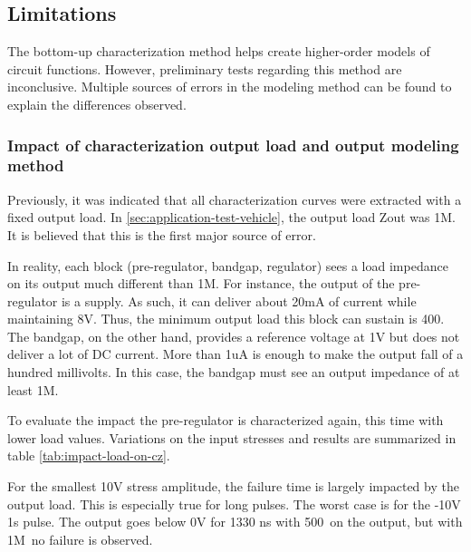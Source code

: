 \subsection{Limitations}
\label{sec:current-limitations}
The bottom-up characterization method helps create higher-order models of circuit functions.
However, preliminary tests regarding this method are inconclusive.
Multiple sources of errors in the modeling method can be found to explain the differences observed.

\subsubsection{Impact of characterization output load and output modeling method}

Previously, it was indicated that all characterization curves were extracted with a fixed output load.
In \ref{sec:application-test-vehicle}, the output load Zout was 1M\textOmega.
It is believed that this is the first major source of error.

In reality, each block (pre-regulator, bandgap, regulator) sees a load impedance on its output much different than 1M\textOmega.
For instance, the output of the pre-regulator is a supply.
As such, it can deliver about 20mA of current while maintaining 8V.
Thus, the minimum output load this block can sustain is 400\textOmega.
The bandgap, on the other hand, provides a reference voltage at 1V but does not deliver a lot of DC current.
More than 1uA is enough to make the output fall of a hundred millivolts.
In this case, the bandgap must see an output impedance of at least 1M\textOmega.

To evaluate the impact the pre-regulator is characterized again, this time with lower load values.
Variations on the input stresses and results are summarized in table \ref{tab:impact-load-on-cz}.

For the smallest 10V stress amplitude, the failure time is largely impacted by the output load.
This is especially true for long pulses.
The worst case is for the -10V 1\textmugreek{}s pulse.
The output goes below 0V for 1330 ns with 500\textOmega\ on the output, but with 1M\textOmega\, no failure is observed.

